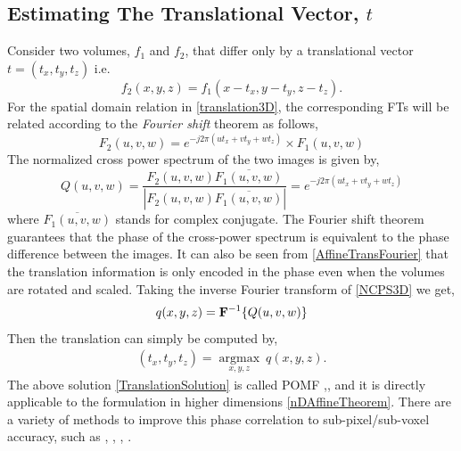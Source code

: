\documentclass{UCF_ETD}
\begin{document}
\subsection{Estimating The Translational Vector, $t$} \label{TranslationSection}
Consider two volumes, $f_1$ and $f_2$, that differ only by a translational vector $ t = ( t_x, t_y, t_z )$ i.e.
\begin{equation} \label{translation3D}
f_2(x,y,z) = f_1(x-t_x,y-t_y,z-t_z).
\end{equation}
For the spatial domain relation in \eqref{translation3D}, the corresponding FTs will be related according to the \emph{Fourier shift} theorem as follows,
\begin{equation}
F_2(u,v,w) = e^{-j2\pi (ut_x+vt_y+wt_z)} \times F_1(u,v,w)
\end{equation}
The normalized cross power spectrum of the two images is given by,
\begin{equation} \label{NCPS3D}
 Q(u,v,w) = \frac{F_2(u,v,w) \overline{ F_1(u,v,w)}}{|F_2(u,v,w) \overline{ F_1(u,v,w)}|} = e^{-j2\pi (ut_x+vt_y+wt_z)}
\end{equation} 
where $\overline{ F_1(u,v,w)}$ stands for complex conjugate. The Fourier shift theorem guarantees that the phase of the cross-power spectrum is equivalent to the phase difference between the images. It can also be seen from \eqref{AffineTransFourier} that the translation information is only encoded in the phase even when the volumes are rotated and scaled. 
Taking the inverse Fourier transform of \eqref{NCPS3D} we get,
\begin{eqnarray} \label{InverseOfPhaseCorrelation}
q(x,y,z) = {\bf F}^{-1} \{ Q(u,v,w)\} 
\end{eqnarray}
Then the translation can simply be computed by, 
\begin{eqnarray} \label{TranslationSolution}
(t_x,t_y,t_z) = \underset{x,y,z}{\operatorname{argmax}} ~ q(x,y,z).
\end{eqnarray}
The above solution \eqref{TranslationSolution} is called POMF \cite{Papoulis1977},\cite{Horner1984}, and it is directly applicable to the formulation in higher dimensions \eqref{nDAffineTheorem}.
There are a variety of methods to improve this phase correlation to sub-pixel/sub-voxel accuracy, such as \cite{Foroosh02}, \cite{Balci2006}, \cite{Guizar2008}, \cite{Tzimiropoulos2011}. 
\end{document}
